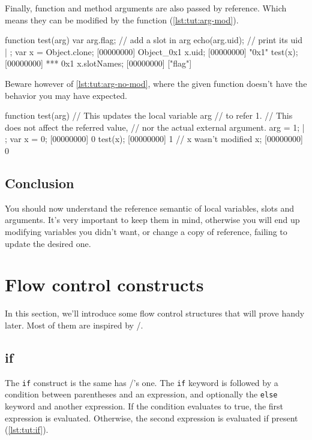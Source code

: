 Finally, function and method arguments are also passed by
reference. Which means they can be modified by the function
(\autoref{lst:tut:arg-mod}).

\begin{urbiscript}[caption=Function modifying its argument,
label=lst:tut:arg-mod]
function test(arg)
{
  var arg.flag;  // add a slot in arg
  echo(arg.uid); // print its uid
} | {};
var x = Object.clone;
[00000000] Object_0x1
x.uid;
[00000000] "0x1"
test(x);
[00000000] *** 0x1
x.slotNames;
[00000000] ["flag"]
\end{urbiscript}

Beware however of \autoref{lst:tut:arg-no-mod}, where the given function doesn't
have the behavior you may have expected.

\begin{urbiscript}[caption=Function failing to modify its argument,
label=lst:tut:arg-no-mod]
function test(arg)
{
  // This updates the local variable arg
  // to refer 1.
  // This does not affect the referred value,
  // nor the actual external argument.
  arg = 1;
} | {};
var x = 0;
[00000000] 0
test(x);
[00000000] 1
// x wasn't modified
x;
[00000000] 0
\end{urbiscript}

\section{Conclusion}

You should now understand the reference semantic of local variables,
slots and arguments. It's very important to keep them in mind,
otherwise you will end up modifying variables you didn't want, or
change a copy of reference, failing to update the desired one.

\chapter{Flow control constructs}

In this section, we'll introduce some flow control structures that
will prove handy later. Most of them are inspired by \C/\Cxx.

\section{if}

The \lstinline{if} construct is the same has \C/\Cxx's one. The
\lstinline{if} keyword is followed by a condition between parentheses and
an expression, and optionally the \lstinline{else} keyword and another
expression. If the condition evaluates to true, the first expression
is evaluated. Otherwise, the second expression is evaluated if
present (\autoref{lst:tut:if}).

